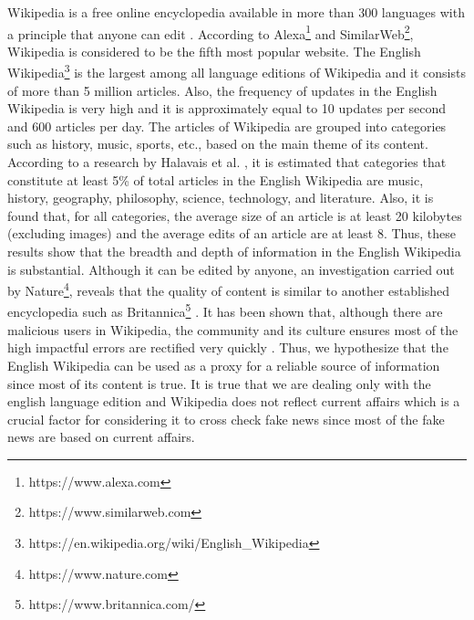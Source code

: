 \documentclass[a4paper, 11pt]{article}
\begin{document}
Wikipedia is a free online encyclopedia available in more than 300 languages with a principle that anyone can edit \parencite{Wales2005}. According to Alexa\footnote{https://www.alexa.com} and SimilarWeb\footnote{https://www.similarweb.com}, Wikipedia is considered to be the fifth most popular website. The English Wikipedia\footnote{https://en.wikipedia.org/wiki/English\_Wikipedia} is the largest among all language editions of Wikipedia and it consists of more than 5 million articles. Also, the frequency of updates in the English Wikipedia is very high and it is approximately equal to 10 updates per second and 600 articles per day. The articles of Wikipedia are grouped into categories such as history, music, sports, etc., based on the main theme of its content. According to a research by Halavais et al. \parencite{Halavais2008}, it is estimated that categories that constitute at least 5\% of total articles in the English Wikipedia are music, history, geography, philosophy, science, technology, and literature. Also, it is found that, for all categories, the average size of an article is at least 20 kilobytes (excluding images) and the average edits of an article are at least 8. Thus, these results show that the breadth and depth of information in the English Wikipedia is substantial. Although it can be edited by anyone, an investigation carried out by Nature\footnote{https://www.nature.com}, reveals that the quality of content is similar to another established encyclopedia such as Britannica\footnote{https://www.britannica.com/} \parencite{Wales2005}. It has been shown that, although there are malicious users in Wikipedia, the community and its culture ensures most of the high impactful errors are rectified very quickly \parencite{Priedhorsky2007}. Thus, we hypothesize that the English Wikipedia can be used as a proxy for a reliable source of information since most of its content is true. \color{red}It is true that we are dealing only with the english language edition and Wikipedia does not reflect current affairs which is a crucial factor for considering it to cross check fake news since most of the fake news are based on current affairs. \color{black}
\end{document}

